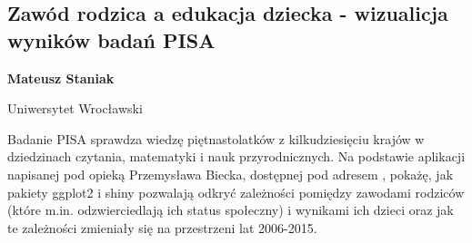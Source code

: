 \documentclass[\main/boa.tex]{subfiles}
\begin{document}
\subsection{Zawód rodzica a edukacja dziecka - wizualicja wyników badań PISA}

\begin{minipage}{0.915\textwidth}
	\centering
  {\bf {} Mateusz Staniak}
\end{minipage}



\begin{affiliations}
\begin{minipage}{0.915\textwidth}
\centering
Uniwersytet Wrocławski \\[-2pt]
\end{minipage}
\end{affiliations}

\vskip 0.3cm

 Badanie PISA sprawdza wiedzę piętnastolatków z kilkudziesięciu krajów w dziedzinach czytania, matematyki i nauk przyrodnicznych. Na podstawie aplikacji napisanej pod opieką Przemysława Biecka, dostępnej pod adresem , pokażę, jak pakiety ggplot2 i shiny pozwalają odkryć zależności pomiędzy zawodami rodziców (które m.in. odzwierciedlają ich status społeczny) i wynikami ich dzieci oraz jak te zależności zmieniały się na przestrzeni lat 2006-2015.
\end{document}
